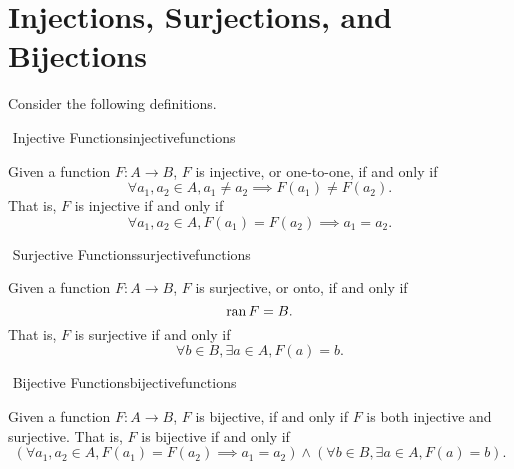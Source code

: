 \pagebreak

\section{Injections, Surjections, and Bijections}

    Consider the following definitions.
    \begin{definition}{\Stop\,\,Injective Functions}{injectivefunctions}
        
        Given a function \(F:A\to B\), \(F\) is injective, or one-to-one, if and only if
        \begin{equation*}
            \forall a_1,a_2\in A,a_1\neq a_2\implies F(a_1)\neq F(a_2).
        \end{equation*}
        That is, \(F\) is injective if and only if
        \begin{equation*}
            \forall a_1,a_2\in A, F(a_1)=F(a_2)\implies a_1=a_2.
        \end{equation*}
        
    \end{definition}
    \begin{definition}{\Stop\,\,Surjective Functions}{surjectivefunctions}
    
        Given a function \(F:A\to B\), \(F\) is surjective, or onto, if and only if
        \begin{equation*}
            \text{ran\,} F = B.
        \end{equation*}
        That is, \(F\) is surjective if and only if
        \begin{equation*}
            \forall b\in B, \exists a\in A,F(a)=b.
        \end{equation*}
        
    \end{definition}
    \begin{definition}{\Stop\,\,Bijective Functions}{bijectivefunctions}
    
        Given a function \(F:A\to B\), \(F\) is bijective, if and only if \(F\) is both injective and surjective. That is, \(F\) is bijective if and only if
        \begin{equation*}
            (\forall a_1,a_2\in A, F(a_1)=F(a_2)\implies a_1=a_2) \wedge (\forall b\in B, \exists a\in A,F(a)=b).
        \end{equation*}
        
    \end{definition}
    \vphantom
    \\

